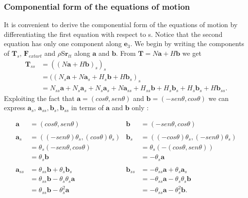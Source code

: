 \documentclass{article}
\begin{document}
\subsubsection{Componential form of the equations of motion}\label{componential-form-of-the-equations-of-motion}

It is convenient to derive the componential form of the equations of motion by differentiating the first equation with respect to s.
Notice that the second equation has only one component along $\mathbf{e}_3$.
We begin by writing the components of $\mathbf{T}_s$, $\mathbf{F}_{extart}$ and $\rho$S$\mathbf{r}_{tt}$ along $\mathbf{a}$ and $\mathbf{b}$. From $\mathbf{T}=N\mathbf{a}+H\mathbf{b}$ we get
\begin{equation}
\begin{split}
\mathbf{T}_{ss}& =((N\mathbf{a}+H\mathbf{b})_s)_s\\
               & =((N_s\mathbf{a}+ N\mathbf{a}_s + H_s\mathbf{b} + H\mathbf{b}_s)_s\\
               & = N_{ss}\mathbf{a} + N_s\mathbf{a}_s + N_s\mathbf{a}_s + N\mathbf{a}_{ss} + H_{ss}\mathbf{b} + H_s\mathbf{b}_s + H_s\mathbf{b}_s + H\mathbf{b}_{ss}.
\end{split}
\end{equation}
Exploiting the fact that $\mathbf{a}=(cos\theta, sen\theta)$ and $\mathbf{b}=(-sen\theta, cos\theta)$ we can express $\mathbf{a}_s$, $\mathbf{a}_{ss}, \mathbf{b}_s, \mathbf{b}_{ss}$ in terms of $\mathbf{a}$ and $\mathbf{b}$ only :

\begin{align}
\mathbf{a}   & = (cos\theta,sen\theta)                        &\mathbf{b}& = (-sen\theta, cos\theta)\\\\
\mathbf{a}_s & = ((-sen\theta)\theta_s, (cos\theta)\theta_s)  &\mathbf{b}_s& = ((-cos\theta)\theta_s, (-sen\theta)\theta_s)\\
             & = \theta_s(-sen\theta, cos\theta)              & &= \theta_s(-(cos\theta, sen\theta))\\
             & =\theta_s\mathbf{b}                            & &= -\theta_s\mathbf{a}\\\\
\mathbf{a}_{ss}& = \theta_{ss}\mathbf{b}+\theta_s\mathbf{b}_s & 
\mathbf{b}_{ss}& = -\theta_{ss}\mathbf{a}+\theta_s\mathbf{a}_s\\
               & = \theta_{ss}\mathbf{b} - \theta_s\theta_s\mathbf{a} & &= -\theta_{ss}\mathbf{a} -\theta_s\theta_s\mathbf{b}\\
               & = \theta_{ss}\mathbf{b} - \theta_s^2\mathbf{a} & &= -\theta_{ss}\mathbf{a} -\theta_s^2\mathbf{b}.
\end{align}
\end{document}
